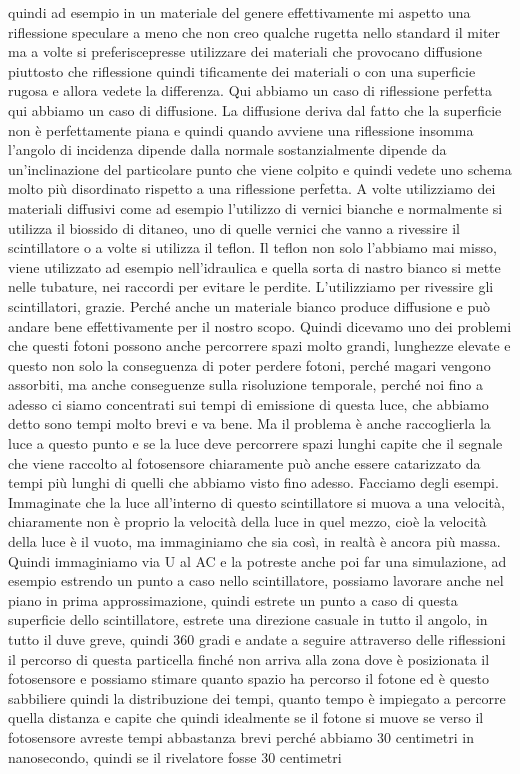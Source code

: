 {quindi ad esempio in un materiale del genere effettivamente mi aspetto una riflessione speculare a meno che non creo qualche rugetta nello standard il miter ma a volte si preferiscepresse utilizzare dei materiali che provocano diffusione piuttosto che riflessione quindi tificamente dei materiali o con una superficie rugosa e allora vedete la differenza. Qui abbiamo un caso di riflessione perfetta qui abbiamo un caso di diffusione. La diffusione deriva dal fatto che la superficie non è perfettamente piana e quindi quando avviene una riflessione insomma l'angolo di incidenza dipende dalla normale sostanzialmente dipende da un'inclinazione del particolare punto che viene colpito e quindi vedete uno schema molto più disordinato rispetto a una riflessione perfetta. A volte utilizziamo dei materiali diffusivi come ad esempio l'utilizzo di vernici bianche e normalmente si utilizza il biossido di ditaneo, uno di quelle vernici che vanno a rivessire il scintillatore o a volte si utilizza il teflon. Il teflon non solo l'abbiamo mai misso, viene utilizzato ad esempio nell'idraulica e quella sorta di nastro bianco si mette nelle tubature, nei raccordi per evitare le perdite. L'utilizziamo per rivessire gli scintillatori, grazie. Perché anche un materiale bianco produce diffusione e può andare bene effettivamente per il nostro scopo. Quindi dicevamo uno dei problemi che questi fotoni possono anche percorrere spazi molto grandi, lunghezze elevate e questo non solo la conseguenza di poter perdere fotoni, perché magari vengono assorbiti, ma anche conseguenze sulla risoluzione temporale, perché noi fino a adesso ci siamo concentrati sui tempi di emissione di questa luce, che abbiamo detto sono tempi molto brevi e va bene. Ma il problema è anche raccoglierla la luce a questo punto e se la luce deve percorrere spazi lunghi capite che il segnale che viene raccolto al fotosensore chiaramente può anche essere catarizzato da tempi più lunghi di quelli che abbiamo visto fino adesso. Facciamo degli esempi. Immaginate che la luce all'interno di questo scintillatore si muova a una velocità, chiaramente non è proprio la velocità della luce in quel mezzo, cioè la velocità della luce è il vuoto, ma immaginiamo che sia così, in realtà è ancora più massa. Quindi immaginiamo via U al AC e la potreste anche poi far una simulazione, ad esempio estrendo un punto a caso nello scintillatore, possiamo lavorare anche nel piano in prima approssimazione, quindi estrete un punto a caso di questa superficie dello scintillatore, estrete una direzione casuale in tutto il angolo, in tutto il duve greve, quindi 360 gradi e andate a seguire attraverso delle riflessioni il percorso di questa particella finché non arriva alla zona dove è posizionata il fotosensore e possiamo stimare quanto spazio ha percorso il fotone ed è questo sabbiliere quindi la distribuzione dei tempi, quanto tempo è impiegato a percorre quella distanza e capite che quindi idealmente se il fotone si muove se verso il fotosensore avreste tempi abbastanza brevi perché abbiamo 30 centimetri in nanosecondo, quindi se il rivelatore fosse 30 centimetri 

}
